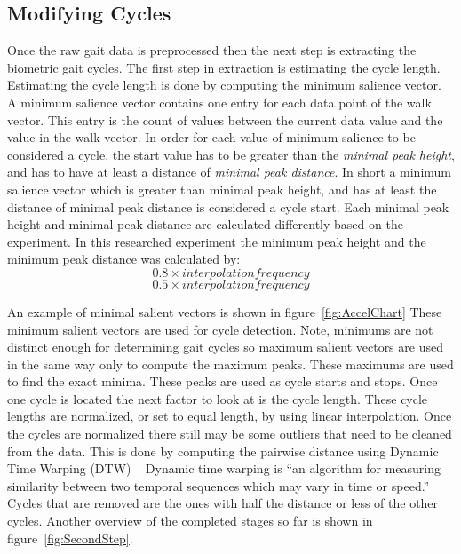 \documentclass{sig-alternate}
\begin{document}
\subsection{Modifying Cycles}
	Once the raw gait data is preprocessed then the next step is extracting the biometric gait cycles. The first step in extraction is estimating the cycle length. Estimating the cycle length is done by computing the minimum salience vector. A minimum salience vector contains one entry for each data point of the walk vector. This entry is the count of values between the current data value and the value in the walk vector. In order for each value of minimum salience to be considered a cycle, the start value has to be greater than the \textit{minimal peak height}, and has to have at least a distance of \textit{minimal peak distance}. In short a minimum salience vector which is greater than minimal peak height, and has at least the distance of minimal peak distance is considered a cycle start. Each minimal peak height and minimal peak distance are calculated differently based on the experiment. In this researched experiment the minimum peak height and the minimum peak distance was calculated by: \begin{displaymath}0.8 \times interpolation frequency \end{displaymath} \begin{displaymath}0.5 \times interpolation frequency \end{displaymath} 
	
An example of minimal salient vectors is shown in figure~\ref{fig:AccelChart} These minimum salient vectors are used for cycle detection. Note, minimums are not distinct enough for determining gait cycles so maximum salient vectors are used in the same way only to compute the maximum peaks. These maximums are used to find the exact minima. These peaks are used as cycle starts and stops. Once one cycle is located the next factor to look at is the cycle length. These cycle lengths are normalized, or set to equal length, by using linear interpolation. Once the cycles are normalized there still may be some outliers that need to be cleaned from the data. This is done by computing the pairwise distance using Dynamic Time Warping (DTW) ~\cite{Muaaz:2013} Dynamic time warping is ``an algorithm for measuring similarity between two temporal sequences which may vary in time or speed.''~\cite{wiki2:2014} Cycles that are removed are the ones with half the distance or less of the other cycles. Another overview of the completed stages so far is shown in figure~\ref{fig:SecondStep}.
\begin{figure*}
\centering
{}
\caption{Minimum Salient Vectors}
\label{fig:AccelChart}
\end{figure*}
\end{document}
